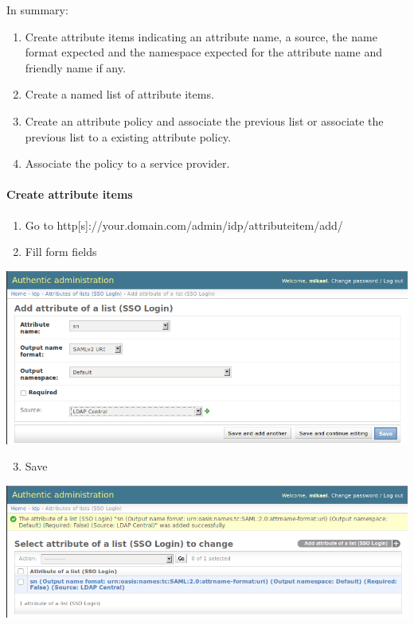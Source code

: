 \documentclass[letterpaper,10pt,english]{sphinxmanual}
\begin{document}
In summary:
\begin{enumerate}
\item {} 
Create attribute items indicating an attribute name, a source, the name format expected and the namespace expected for the attribute name and friendly name if any.

\item {} 
Create a named list of attribute items.

\item {} 
Create an attribute policy and associate the previous list or associate the previous list to a existing attribute policy.

\item {} 
Associate the policy to a service provider.

\end{enumerate}


\paragraph{Create attribute items}
\label{attribute_management:create-attribute-items}\begin{enumerate}
\item {} 
Go to http{[}s{]}://your.domain.com/admin/idp/attributeitem/add/

\item {} 
Fill form fields

\end{enumerate}

\includegraphics{attribute_item.png}
\begin{enumerate}
\setcounter{enumi}{2}
\item {} 
Save

\end{enumerate}

\includegraphics{attribute_item_saved.png}
\end{document}

